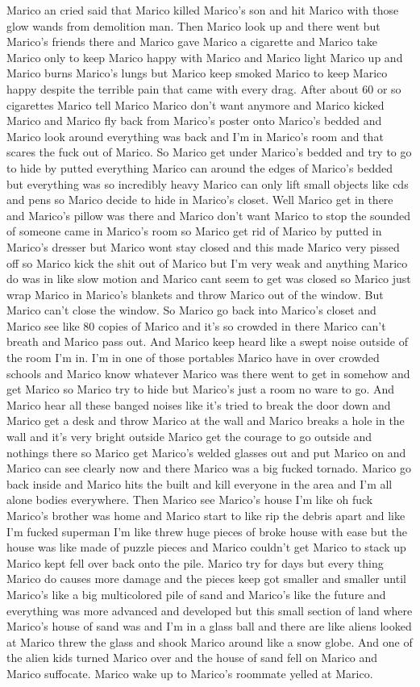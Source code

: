 \documentclass[12pt]{book}
\begin{document}
Marico an cried said that Marico killed Marico's son and hit Marico with those glow wands from demolition man. Then Marico look up and there went but Marico's friends there and Marico gave Marico a cigarette and Marico take Marico only to keep Marico happy with Marico and Marico light Marico up and Marico burns Marico's lungs but Marico keep smoked Marico to keep Marico happy despite the terrible pain that came with every drag. After about 60 or so cigarettes Marico tell Marico Marico don't want anymore and Marico kicked Marico and Marico fly back from Marico's poster onto Marico's bedded and Marico look around everything was back and I'm in Marico's room and that scares the fuck out of Marico. So Marico get under Marico's bedded and try to go to hide by putted everything Marico can around the edges of Marico's bedded but everything was so incredibly heavy Marico can only lift small objects like cds and pens so Marico decide to hide in Marico's closet. Well Marico get in there and Marico's pillow was there and Marico don't want Marico to stop the sounded of someone came in Marico's room so Marico get rid of Marico by putted in Marico's dresser but Marico wont stay closed and this made Marico very pissed off so Marico kick the shit out of Marico but I'm very weak and anything Marico do was in like slow motion and Marico cant seem to get was closed so Marico just wrap Marico in Marico's blankets and throw Marico out of the window. But Marico can't close the window. So Marico go back into Marico's closet and Marico see like 80 copies of Marico and it's so crowded in there Marico can't breath and Marico pass out. And Marico keep heard like a swept noise outside of the room I'm in. I'm in one of those portables Marico have in over crowded schools and Marico know whatever Marico was there went to get in somehow and get Marico so Marico try to hide but Marico's just a room no ware to go. And Marico hear all these banged noises like it's tried to break the door down and Marico get a desk and throw Marico at the wall and Marico breaks a hole in the wall and it's very bright outside Marico get the courage to go outside and nothings there so Marico get Marico's welded glasses out and put Marico on and Marico can see clearly now and there Marico was a big fucked tornado. Marico go back inside and Marico hits the built and kill everyone in the area and I'm all alone bodies everywhere. Then Marico see Marico's house I'm like oh fuck Marico's brother was home and Marico start to like rip the debris apart and like I'm fucked superman I'm like threw huge pieces of broke house with ease but the house was like made of puzzle pieces and Marico couldn't get Marico to stack up Marico kept fell over back onto the pile. Marico try for days but every thing Marico do causes more damage and the pieces keep got smaller and smaller until Marico's like a big multicolored pile of sand and Marico's like the future and everything was more advanced and developed but this small section of land where Marico's house of sand was and I'm in a glass ball and there are like aliens looked at Marico threw the glass and shook Marico around like a snow globe. And one of the alien kids turned Marico over and the house of sand fell on Marico and Marico suffocate. Marico wake up to Marico's roommate yelled at Marico. 
\end{document}
